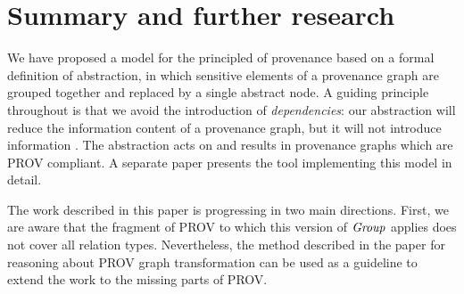 
\section{Summary and further research}
\label{sec:further}

We have proposed a model for the principled  of provenance based on a formal definition of abstraction, in which sensitive elements of a provenance graph are grouped together and replaced by a single abstract node.  
A guiding principle  throughout is that we avoid the introduction of \emph{ dependencies}: our abstraction will reduce the information content of a provenance graph, but it will not introduce information .  
The abstraction acts on and results in provenance graphs which are PROV compliant.   A separate paper presents the tool implementing this model in detail.



The work described in this paper is progressing in two main directions.
%
First, we are aware that the fragment of PROV to which this version of $\mathit{Group}$ applies does not cover all relation types. Nevertheless, the method described in the paper for reasoning about PROV graph transformation can be used as a guideline to extend the work to the missing parts of PROV. %


